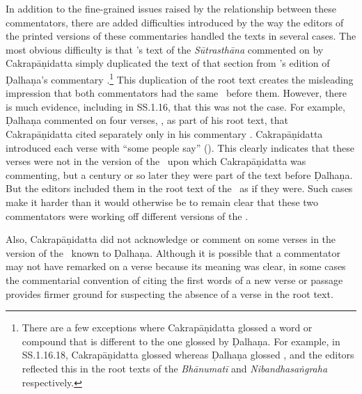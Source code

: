 In addition to the fine-grained issues raised by the relationship between these
commentators, there are added difficulties introduced by the way the editors of
the printed versions of these commentaries handled the texts in several cases. The
most obvious difficulty is that \citeauthor{acar-1939}'s text of the
\emph{Sūtrasthāna} commented on by Cakrapāṇidatta \citep{acar-1939} simply
duplicated the text of that section from \citeauthor{vulgate}'s edition of
Ḍalhaṇa's commentary \citep{vulgate}.\footnote{There are a few exceptions where
Cakrapāṇidatta glossed a word or compound that is different to the one glossed by
Ḍalhaṇa. For example, in SS.1.16.18, Cakrapāṇidatta glossed 
whereas Ḍalhaṇa glossed , and the editors reflected this in the
root texts of the \emph{Bhānumatī} \citep[130]{acar-1939} and
\emph{Nibandhasaṅgraha} \citep[79]{vulgate} respectively.} This duplication of the
root text creates the misleading impression that both commentators had the same
\SS\ before them. However, there is much evidence, including in SS.1.16, that this
was not the case. For example, Ḍalhaṇa commented on four verses,
, as part of his root text, that Cakrapāṇidatta cited
separately only in his commentary \citep[128–129]{acar-1939}.  Cakrapāṇidatta
introduced each verse with “some people say” (). This clearly
indicates that these verses were not in the version of the \SS\ upon which
Cakrapāṇidatta was commenting, but a century or so later they were part of the
text before Ḍalhaṇa.  But the editors \citeauthor{acar-1939} included them in the root text
of the \SS\ as if they were.  Such cases make it harder than it would otherwise be
to remain clear that these two commentators were working off different versions of
the \SS.

Also, Cakrapāṇidatta did not acknowledge or comment on some verses in the version
of the \SS\ known to Ḍalhaṇa. Although it is possible that a commentator may not
have remarked on a verse because its meaning was clear, in some cases the
commentarial convention of citing the first words of a new verse or passage
provides firmer ground for suspecting the absence of a verse in the root text. 

